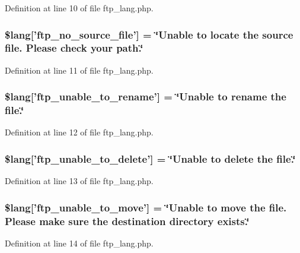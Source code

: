 Definition at line 10 of file ftp\-\_\-lang.\-php.

\subsubsection[{\$lang}]{\setlength{\rightskip}{0pt plus 5cm}\$lang['ftp\-\_\-no\-\_\-source\-\_\-file'] = \char`\"{}Unable {\bf to} locate the source file. Please check your path.\char`\"{}}\label{ftp__lang_8php_abf3e74ee1af13c9b0f0cc63fbb9081f1}


Definition at line 11 of file ftp\-\_\-lang.\-php.

\subsubsection[{\$lang}]{\setlength{\rightskip}{0pt plus 5cm}\$lang['ftp\-\_\-unable\-\_\-to\-\_\-rename'] = \char`\"{}Unable {\bf to} rename the file.\char`\"{}}\label{ftp__lang_8php_ae2715b036a8015f4da2841c15ab8db79}


Definition at line 12 of file ftp\-\_\-lang.\-php.

\subsubsection[{\$lang}]{\setlength{\rightskip}{0pt plus 5cm}\$lang['ftp\-\_\-unable\-\_\-to\-\_\-delete'] = \char`\"{}Unable {\bf to} delete the file.\char`\"{}}\label{ftp__lang_8php_a922b1d7a3667e2cacb0873788e548dca}


Definition at line 13 of file ftp\-\_\-lang.\-php.

\subsubsection[{\$lang}]{\setlength{\rightskip}{0pt plus 5cm}\$lang['ftp\-\_\-unable\-\_\-to\-\_\-move'] = \char`\"{}Unable {\bf to} move the file. Please make sure the destination directory exists.\char`\"{}}\label{ftp__lang_8php_a72178091982e6697b12337601213fa76}


Definition at line 14 of file ftp\-\_\-lang.\-php.

